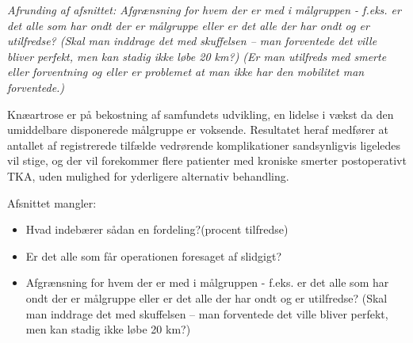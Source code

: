 \textit{Afrunding af afsnittet: 
Afgrænsning for hvem der er med i målgruppen - f.eks. er det alle som har ondt der er målgruppe eller er det alle der har ondt og er utilfredse? (Skal man inddrage det med skuffelsen – man forventede det ville bliver perfekt, men kan stadig ikke løbe 20 km?) (Er man utilfreds med smerte eller forventning og eller er problemet at man ikke har den mobilitet man forventede.) }

Knæartrose er på bekostning af samfundets udvikling, en lidelse i vækst da den umiddelbare disponerede målgruppe er voksende. Resultatet heraf medfører at antallet af registrerede tilfælde vedrørende komplikationer sandsynligvis ligeledes vil stige, og der vil forekommer flere patienter med kroniske smerter postoperativt TKA, uden mulighed for yderligere alternativ behandling. 


Afsnittet mangler:
\begin{itemize}
	\item Hvad indebærer sådan en fordeling?(procent tilfredse)
	\item Er det alle som får operationen foresaget af slidgigt?
	\item Afgrænsning for hvem der er med i målgruppen - f.eks. er det alle som har ondt der er målgruppe eller er det alle der har ondt og er utilfredse? (Skal man inddrage det med skuffelsen – man forventede det ville bliver perfekt, men kan stadig ikke løbe 20 km?) 

\end{itemize}


